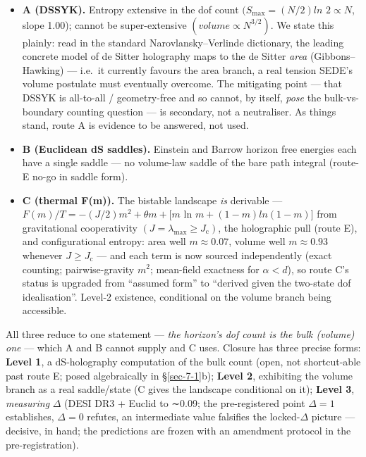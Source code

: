 \documentclass[aps,prd,preprint,nofootinbib,superscriptaddress]{revtex4-2}
\providecommand{\tightlist}{\setlength{\itemsep}{0pt}\setlength{\parskip}{0pt}}
\begin{document}
\begin{itemize}
\tightlist
\item
  \textbf{A (DSSYK).} Entropy extensive in the dof count
  \((S_{\mathrm{max}} = (N/2)ln\) \(2 \propto  N\), slope 1.00); cannot
  be super-extensive \((volume \propto  N^{3/2})\). We state this
  plainly: read in the standard Narovlansky--Verlinde dictionary, the
  leading concrete model of de Sitter holography maps to the de Sitter
  \emph{area} (Gibbons--Hawking) --- i.e.~it currently favours the area
  branch, a real tension SEDE's volume postulate must eventually
  overcome. The mitigating point --- that DSSYK is all-to-all /
  geometry-free and so cannot, by itself, \emph{pose} the
  bulk-vs-boundary counting question --- is secondary, not a
  neutraliser. As things stand, route A is evidence to be answered, not
  used.
\item
  \textbf{B (Euclidean dS saddles).} Einstein and Barrow horizon free
  energies each have a single saddle --- no volume-law saddle of the
  bare path integral (route-E no-go in saddle form).
\item
  \textbf{C (thermal F(m)).} The bistable landscape \emph{is} derivable
  --- \(F(m)/T = -(J/2)m^{2} + \theta m + [m\) ln
  \(m + (1-m)ln(1-m)\){]} from gravitational cooperativity
  \((J = \lambda _{\mathrm{max}} \geq  J_{\mathrm{c}})\), the
  holographic pull (route E), and configurational entropy: area well
  \(m \approx  0.07\), volume well \(m \approx  0.93\) whenever
  \(J \geq  J_{\mathrm{c}}\) --- and each term is now sourced
  independently (exact counting; pairwise-gravity \(m^{2}\); mean-field
  exactness for \(\alpha  < d\)), so route C's status is upgraded from
  ``assumed form'' to ``derived given the two-state dof idealisation''.
  Level-2 existence, conditional on the volume branch being accessible.
\end{itemize}

All three reduce to one statement --- \emph{the horizon's dof count is
the bulk (volume) one} --- which A and B cannot supply and C uses.
Closure has three precise forms: \textbf{Level 1}, a dS-holography
computation of the bulk count (open, not shortcut-able past route E;
posed algebraically in §\ref{sec-7-1}b); \textbf{Level 2}, exhibiting
the volume branch as a real saddle/state (C gives the landscape
conditional on it); \textbf{Level 3}, \emph{measuring} \(\Delta\) (DESI
DR3 + Euclid to ∼0.09; the pre-registered point \(\Delta  = 1\)
establishes, \(\Delta  = 0\) refutes, an intermediate value falsifies
the locked-\(\Delta\) picture --- decisive, in hand; the predictions are
frozen with an amendment protocol in the pre-registration).
\end{document}
